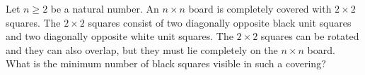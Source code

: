Let $n \ge 2$ be a natural number. An $n \times n$ board is completely
covered with $2\times 2$ squares. The $2 \times 2$ squares consist of two diagonally opposite
black unit squares and two diagonally opposite white unit squares.
The $2\times 2$ squares can be rotated and they can also overlap,
but they must lie completely on the $n\times n$ board. What is the minimum
number of black squares visible in such a covering?